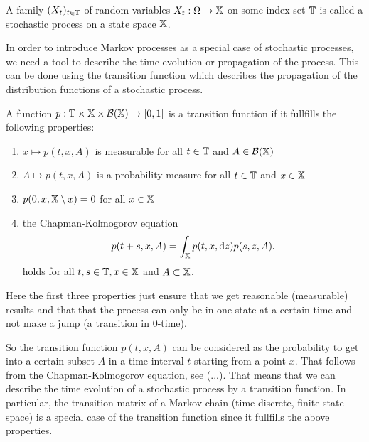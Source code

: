 \begin{defi}
A family $(X_t)_{t\in\mathbb{T}}$ of random variables $X_t : \Omega \rightarrow \mathbb{X}$ on some index set $\mathbb{T}$ is called
a stochastic process on a state space $\mathbb{X}$. 
\end{defi}

In order to introduce Markov processes as a special case of stochastic processes, we need a
tool to describe the time evolution or propagation of the process. This can be done using the transition function which describes the propagation of the distribution functions of a stochastic process.

\begin{defi}
A function $p: \mathbb{T} \times \mathbb{X} \times \mathcal{B}(\mathbb{X}) \rightarrow [0,1]$ is a transition function if it fullfills the following properties: 
\begin{enumerate}
\item $x \mapsto p(t,x,A)$ is measurable for all $t\in\mathbb{T}$ and $A\in\mathcal{B}(\mathbb{X})$
\item $A \mapsto p(t,x,A)$ is a probability measure for all $t\in\mathbb{T}$ and $x\in\mathbb{X}$
\item $p(0,x,\mathbb{X} \setminus x) = 0$ for all $x \in\mathbb{X}$
\item the Chapman-Kolmogorov equation
\begin{equation}
p(t+s,x,A) = \int_{\mathbb{X}} p(t,x,\mathop{}\!\mathrm{d} z)p(s,z,A).
\end{equation}
holds for all $t,s\in\mathbb{T}, x\in\mathbb{X}$ and $A\subset\mathbb{X}$.
\end{enumerate}
\end{defi}
Here the first three properties just ensure that we get reasonable (measurable) results and that that the process can only be in one state at a certain time and not make a jump (a transition in $0$-time).

So the transition function $p(t,x,A)$ can be considered as the probability  to get into a certain subset $A$ in a time interval $t$ starting from a point $x$.
That follows from the Chapman-Kolmogorov equation, see (...). 
That means that we can describe the time evolution of a stochastic process by a transition function.
In particular, the transition matrix of a Markov chain (time discrete, finite state space) is a special case of the transition function since it fullfills the above properties.

